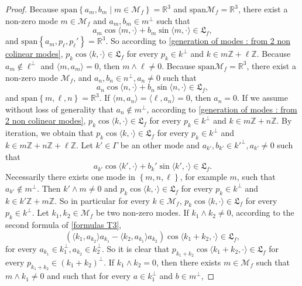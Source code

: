 \documentclass[10pt]{article}
\newcommand{\R}{{\mathbb R}}
\newcommand{\Z}{{\mathbb Z}}
\newcommand{\M}{{\mathcal M}}
\newcommand{\la}{\langle}
\newcommand{\ra}{\rangle}
\newcommand{\we}{\wedge}
\begin{document}
\begin{proof}
    Because $\mathrm{span}\left\{a_m,b_m \mid m \in \M_f\right\}=\R^3$ and $\mathrm{span}\M_f=\R^3$, there exist a non-zero mode $m \in \M_f$ and $a_m,b_m\in m^{\perp}$ such that 
    \begin{equation*}
        a_m \cos \la m,\cdot \ra +b_m \sin \la m,\cdot \ra \in \mathfrak{L}_f,
    \end{equation*}
    and $\mathrm{span} \left\{a_m,p_\ell,p_\ell'\right\}=\R^3$. So according to \cref{generation of modes : from 2 non colinear modes}, $p_k \cos \la k,\cdot \ra \in \mathfrak{L}_f$ for every $p_k\in k^{\perp}$ and $k \in m\Z+\ell \Z$. Because $a_m \notin \ell^{\perp}$ and $\la m,a_m \ra=0$, then $m\we \ell \neq 0$. Because $\mathrm{span} \M_f=\R^3$, there exist a non-zero mode $\M_f$, and $a_n,b_n\in n^{\perp},a_n\neq0$ such that 
    \begin{equation*}
        a_n\cos \la n,\cdot \ra +b_n \sin \la n,\cdot \ra \in \mathfrak{L}_f,
    \end{equation*}
    and $\mathrm{span} \left\{m,\ell,n\right\}=\R^3$. If $\la m,a_n\ra = \la \ell, a_n \ra =0$, then $a_n =0$. If we assume without loss of generality that $a_n \notin m^{\perp}$, according to \cref{generation of modes : from 2 non colinear modes}, $p_k\cos \la k,\cdot \ra \in \mathfrak{L}_f$ for every $p_k\in k^{\perp}$ and $k \in m\Z+n\Z$. By iteration, we obtain that $p_k \cos \la k,\cdot \ra \in \mathfrak{L}_f$ for every $p_k\in k^{\perp}$ and $k \in m\Z+n \Z+\ell \Z$. Let $k' \in \Gamma$ be an other mode and $a_{k'},b_{k'}\in {k'}^{\perp},a_{k'}\neq 0$ such that 
    \begin{equation*}
        a_{k'}\cos \la k',\cdot \ra + b_k'\sin \la k',\cdot \ra \in  \mathfrak{L}_f.
    \end{equation*}
    Necessarily there exists one mode in $\left\{m,n,\ell\right\}$, for example $m$, such that $a_{k'}\notin m^{\perp}$. Then $k'\we m \neq 0$ and $p_{k}\cos \la k,\cdot \ra \in \mathfrak{L}_f$ for every $p_k \in k^{\perp}$ and $k \in k'\Z + m\Z$. So in particular for every $k \in \M_f$, $p_k \cos \la k,\cdot \ra \in \mathfrak{L}_f$ for every $p_k \in k^{\perp}$. Let $k_1,k_2 \in \M_f$ be two non-zero modes. If $k_1\we k_2\neq0$, according to the second formula of \cref{formulas T3},
    \begin{equation}
        (\la k_1,a_{k_2}\ra a_{k_1}-\la k_2,a_{k_1}\ra a_{k_2})\cos \la k_1+k_2, \cdot \ra \in \mathfrak{L}_f,
    \end{equation}
    for every $a_{k_1}\in k_1^{\perp}, a_{k_2}\in k_2^{\perp}$. So it is clear that $p_{k_1+k_2}\cos \la k_1+k_2,\cdot \ra \in \mathfrak{L}_f$ for every $p_{k_1+k_2}\in (k_1+k_2)^{\perp}$. If $k_1\we k_2=0$, then there exists $m \in \M_f$ such that $m\we k_1\neq 0$ and such that for every $a\in k_1^{\perp}$ and $b \in m^{\perp}$, 

\end{proof}
\end{document}
